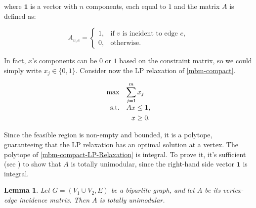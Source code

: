 \documentclass[12pt]{report}
\newtheorem{llemma}[base]{Lemma}
\numberwithin{algorithm}{chapter}
\begin{document}
	where $\mathbf{1}$ is a vector with $n$ components, each equal to $1$ and the matrix $A$ is defined as:
	
	\[
	A_{v,e} =
	\begin{cases}
		1, & \text{if  } v \text{ is incident to edge } e,\\
		0, & \text{otherwise.}
	\end{cases}
	\]
	
	In fact, $x$'s components can be $0$ or $1$ based on the constraint matrix, so we could simply write $x_{j} \in \{0, 1\}$. Consider now the LP relaxation of \eqref{mbm-compact}.
	
	\begin{equation} \label{mbm-compact-LP-Relaxation}
		\begin{array}{r@{\quad}l}
			\max & \displaystyle\sum_{j=1}^{m} x_j \\[2mm]
			\text{s.t.} &
			\begin{aligned}[t]
				Ax &\leq \mathbf{1},\\
				x &\geq 0.
			\end{aligned}
		\end{array}
	\end{equation}	
	
	Since the feasible region is non-empty and bounded, it is a polytope, guaranteeing that the LP relaxation has an optimal solution at a vertex. The polytope of \eqref{mbm-compact-LP-Relaxation} is integral. To prove it, it's sufficient (see ) to show that $A$ is totally unimodular, since the right-hand side vector $\mathbf{1}$ is integral.
	
	\begin{llemma}
		Let $G=(V_{1}\cup V_{2},E)$ be a bipartite graph, and let $A$ be its vertex-edge incidence matrix. Then $A$ is totally unimodular.
	\end{llemma}
	
\end{document}
